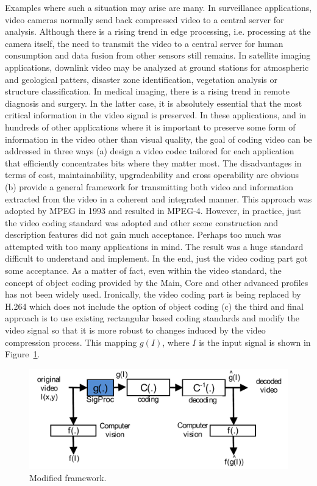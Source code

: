 \documentclass{article}
\begin{document}
Examples where such a situation may arise are many.  In surveillance applications, video cameras normally send back compressed video to a central server for analysis.  Although there is a rising trend in edge processing, i.e. processing at the camera itself, the need to transmit the video to a central server for human consumption and data fusion from other sensors still remains.  In satellite imaging applications, downlink video may be analyzed at ground stations for atmospheric and geological patters, disaster zone identification, vegetation analysis or structure classification.  In medical imaging, there is a rising trend in remote diagnosis and surgery.  In the latter case, it is absolutely essential that the most critical information in the video signal is preserved.  In these applications, and in hundreds of other applications where it is important to preserve some form of information in the video other than visual quality, the goal of coding video can be addressed in three ways (a) design a video codec tailored for each application that efficiently concentrates bits where they matter most.  The disadvantages in terms of cost, maintainability, upgradeability and cross operability are obvious (b) provide a general framework for transmitting both video and information extracted from the video in a coherent and integrated manner.  This approach was adopted by MPEG in 1993 and resulted in MPEG-4.  However, in practice, just the video coding standard was adopted and other scene construction and description features did not gain much acceptance.  Perhaps too much was attempted with too many applications in mind.  The result was a huge standard difficult to understand and implement.  In the end, just the video coding part got some acceptance.  As a matter of fact, even within the video standard, the concept of object coding provided by the Main, Core and other advanced profiles has not been widely used.  Ironically, the video coding part is being replaced by H.264 which does not include the option of object coding (c) the third and final approach is to use existing rectangular based coding standards and modify the video signal so that it is more robust to changes induced by the video compression process.  This mapping $g(I)$, where $I$ is the input signal is shown in Figure~\ref{fig:SolutionThroughSigProc}.  

\begin{figure}[h]
			\centering
			\includegraphics[width=.45\textwidth]{figs/ICIP2009_BlockDiagram_2_sigProc}
			\caption{Modified framework.}
			\label{fig:SolutionThroughSigProc}
\end{figure}
\end{document}
